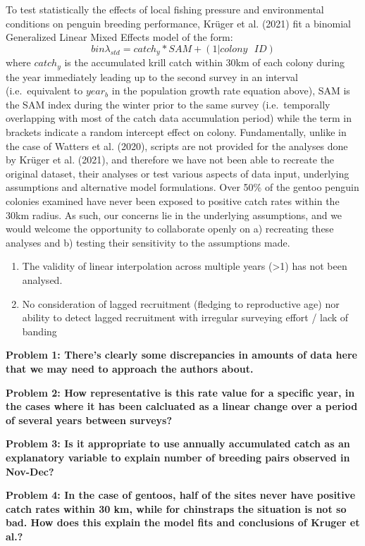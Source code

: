 \documentclass[]{elsarticle} %
\begin{document}
To test statistically the effects of local fishing pressure and
environmental conditions on penguin breeding performance, Krüger et al.
(2021) fit a binomial Generalized Linear Mixed Effects model of the
form: \[bin\lambda_{std}=catch_y*SAM+(1|colony\text{ }ID)\] where
\(catch_y\) is the accumulated krill catch within 30km of each colony
during the year immediately leading up to the second survey in an
interval (i.e.~equivalent to \(year_b\) in the population growth rate
equation above), SAM is the SAM index during the winter prior to the
same survey (i.e.~temporally overlapping with most of the catch data
accumulation period) while the term in brackets indicate a random
intercept effect on colony. Fundamentally, unlike in the case of Watters
et al. (2020), scripts are not provided for the analyses done by Krüger
et al. (2021), and therefore we have not been able to recreate the
original dataset, their analyses or test various aspects of data input,
underlying assumptions and alternative model formulations. Over 50\% of
the gentoo penguin colonies examined have never been exposed to positive
catch rates within the 30km radius. As such, our concerns lie in the
underlying assumptions, and we would welcome the opportunity to
collaborate openly on a) recreating these analyses and b) testing their
sensitivity to the assumptions made.

\begin{enumerate}
\def\labelenumi{\arabic{enumi}.}
\setcounter{enumi}{2}
\item
  The validity of linear interpolation across multiple years
  (\textgreater1) has not been analysed.
\item
  No consideration of lagged recruitment (fledging to reproductive age)
  nor ability to detect lagged recruitment with irregular surveying
  effort / lack of banding
\end{enumerate}

\textbf{Problem 1: There's clearly some discrepancies in amounts of data
here that we may need to approach the authors about.}

\textbf{Problem 2: How representative is this rate value for a specific
year, in the cases where it has been calcluated as a linear change over
a period of several years between surveys?}

\textbf{Problem 3: Is it appropriate to use annually accumulated catch
as an explanatory variable to explain number of breeding pairs observed
in Nov-Dec?}

\textbf{Problem 4: In the case of gentoos, half of the sites never have
positive catch rates within 30 km, while for chinstraps the situation is
not so bad. How does this explain the model fits and conclusions of
Kruger et al.?}
\end{document}
